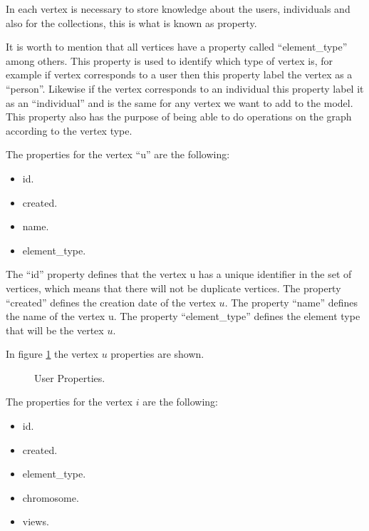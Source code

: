In each vertex is necessary to store knowledge about the users, individuals and
also for the collections, this is what is known as property.

It is worth to mention that all vertices have a property called “element\_type”
among others. This property is used to identify which type of vertex is, for
example if vertex corresponds to a user then this property label the vertex as a
“person”. Likewise if the vertex corresponds to an individual this property
label it as an “individual” and is the same for any vertex we want to add to the
model. This property also has the purpose of being able to do operations on the
graph according to the vertex type.

The properties for the vertex “u” are the following:

\begin{itemize}
\item id.
\item created.
\item name.
\item element\_type.
\end{itemize}

The “id” property defines that the vertex u has a unique identifier in the set
of vertices, which means that there will not be duplicate vertices. The property
“created” defines the creation date of the vertex $u$. The property “name”
defines the name of the vertex u. The property “element\_type” defines the
element type that will be the vertex $u$.

In figure \ref{fig:User_node} the vertex $u$ properties are shown.

\begin{figure}
\captionsetup{justification=centering,margin=2cm}
\centering
\setlength\fboxsep{0pt}
\setlength\fboxrule{0.7pt}
\caption{User Properties.}
\label{fig:User_node}
\end{figure}

The properties for the vertex $i$ are the following:
\begin{itemize}
\item id.
\item created.
\item element\_type.
\item chromosome.
\item views.
\end{itemize}

